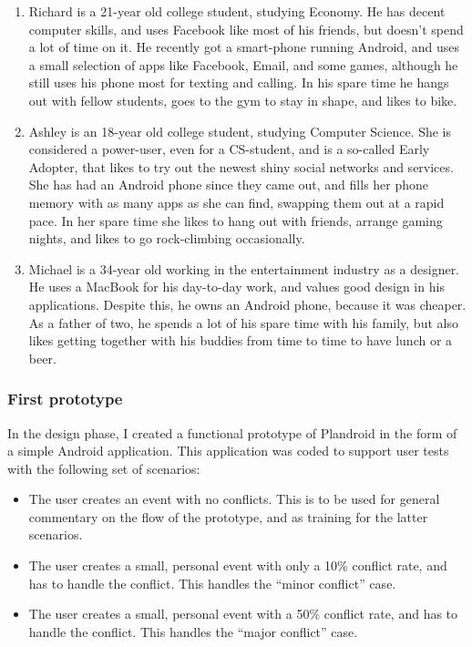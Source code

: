 \documentclass[a4paper,11pt]{report}
\begin{document}
\begin{enumerate}
\item Richard is a 21-year old college student, studying Economy. He has decent
  computer skills, and uses Facebook like most of his friends, but doesn't spend
  a lot of time on it. He recently got a smart-phone running Android, and uses a
  small selection of apps like Facebook, Email, and some games, although he
  still uses his phone most for texting and calling. In his spare time he hangs
  out with fellow students, goes to the gym to stay in shape, and likes to bike.
\item Ashley is an 18-year old college student, studying Computer Science. She
  is considered a power-user, even for a CS-student, and is a so-called Early
  Adopter, that likes to try out the newest shiny social networks and
  services. She has had an Android phone since they came out, and fills her
  phone memory with as many apps as she can find, swapping them out at a rapid
  pace. In her spare time she likes to hang out with friends, arrange gaming
  nights, and likes to go rock-climbing occasionally.
\item Michael is a 34-year old working in the entertainment industry as a
  designer. He uses a MacBook for his day-to-day work, and values good design in
  his applications. Despite this, he owns an Android phone, because it was
  cheaper. As a father of two, he spends a lot of his spare time with his
  family, but also likes getting together with his buddies from time to time to
  have lunch or a beer.
\end{enumerate}

\subsubsection{First prototype}

In the design phase, I created a functional prototype of Plandroid in the form
of a simple Android application. This application was coded to support user
tests with the following set of scenarios:

\begin{itemize}
\item The user creates an event with no conflicts. This is to be used for
  general commentary on the flow of the prototype, and as training for the
  latter scenarios.
\item The user creates a small, personal event with only a 10\% conflict rate,
  and has to handle the conflict. This handles the ``minor conflict'' case.
\item The user creates a small, personal event with a 50\% conflict rate, and
  has to handle the conflict. This handles the ``major conflict'' case.
\end{itemize}
\end{document}
